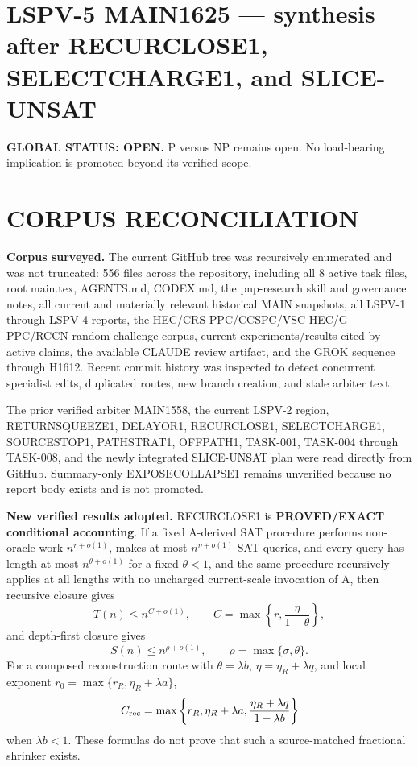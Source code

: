 \documentclass[11pt]{article}
\begin{document}
\section*{LSPV-5 MAIN1625 --- synthesis after RECURCLOSE1, SELECTCHARGE1, and SLICE-UNSAT}
\textbf{GLOBAL STATUS: OPEN.} P versus NP remains open. No load-bearing implication is promoted beyond its verified scope.

\section*{CORPUS RECONCILIATION}
\textbf{Corpus surveyed.}
The current GitHub tree was recursively enumerated and was not truncated: 556 files across the repository, including all 8 active task files, root main.tex, AGENTS.md, CODEX.md, the pnp-research skill and governance notes, all current and materially relevant historical MAIN snapshots, all LSPV-1 through LSPV-4 reports, the HEC/CRS-PPC/CCSPC/VSC-HEC/G-PPC/RCCN random-challenge corpus, current experiments/results cited by active claims, the available CLAUDE review artifact, and the GROK sequence through H1612. Recent commit history was inspected to detect concurrent specialist edits, duplicated routes, new branch creation, and stale arbiter text.

The prior verified arbiter MAIN1558, the current LSPV-2 region, RETURNSQUEEZE1, DELAYOR1, RECURCLOSE1, SELECTCHARGE1, SOURCESTOP1, PATHSTRAT1, OFFPATH1, TASK-001, TASK-004 through TASK-008, and the newly integrated SLICE-UNSAT plan were read directly from GitHub. Summary-only EXPOSECOLLAPSE1 remains unverified because no report body exists and is not promoted.

\textbf{New verified results adopted.}
RECURCLOSE1 is \textbf{PROVED/EXACT conditional accounting}. If a fixed A-derived SAT procedure performs non-oracle work \(n^{r+o(1)}\), makes at most \(n^{\eta+o(1)}\) SAT queries, and every query has length at most \(n^{\theta+o(1)}\) for a fixed \(\theta<1\), and the same procedure recursively applies at all lengths with no uncharged current-scale invocation of A, then recursive closure gives
\[
T(n)\le n^{C+o(1)},\qquad
C=\max\left\{r,\frac{\eta}{1-\theta}\right\},
\]
and depth-first closure gives
\[
S(n)\le n^{\rho+o(1)},\qquad
\rho=\max\{\sigma,\theta\}.
\]
For a composed reconstruction route with \(\theta=\lambda b\), \(\eta=\eta_R+\lambda q\), and local exponent \(r_0=\max\{r_R,\eta_R+\lambda a\}\),
\[
C_{\rm rec}
=
\max\left\{
r_R,\eta_R+\lambda a,
\frac{\eta_R+\lambda q}{1-\lambda b}
\right\}
\]
when \(\lambda b<1\). These formulas do not prove that such a source-matched fractional shrinker exists.
\end{document}
